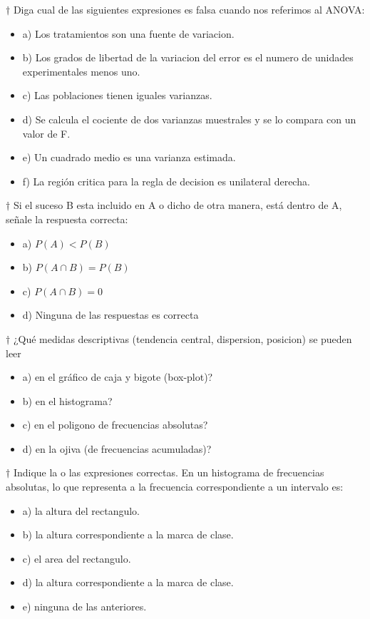 \documentclass[10pt,a4paper]{article}
\begin{document}
$\dagger$	Diga cual de las siguientes expresiones es falsa cuando nos referimos al ANOVA:
	\begin{itemize}
		\item a) Los tratamientos son una fuente de variacion.
		\item b) Los grados de libertad de la variacion del error es el numero de unidades experimentales menos uno.
		\item c) Las poblaciones tienen iguales varianzas.
		\item d) Se calcula el cociente de dos varianzas muestrales y se lo compara con un valor de F.
		\item e) Un cuadrado medio es una varianza estimada.
		\item f) La región critica para la regla de decision es unilateral derecha.
	\end{itemize}

$\dagger$ Si el suceso B esta incluido en A o dicho de otra manera, está dentro de A, señale la respuesta correcta:
\begin{itemize}
	\item a) $P(A)<P(B)$
	\item b) $P(A\cap B) = P(B)$
	\item c) $P(A\cap B) = 0$
	\item d) Ninguna de las respuestas es correcta 
\end{itemize}

$\dagger$ ¿Qué medidas descriptivas (tendencia central, dispersion, posicion) se pueden leer
\begin{itemize}
	\item a) en el gráfico de caja y bigote (box-plot)?
	\item b) en el histograma?
	\item c) en el poligono de frecuencias absolutas?
	\item d) en la ojiva (de frecuencias acumuladas)?
\end{itemize}

$\dagger$ Indique la o las expresiones correctas. En un histograma de frecuencias absolutas, lo que representa a la frecuencia correspondiente a un intervalo es:
\begin{itemize}
	\item a) la altura del rectangulo.
	\item b) la altura correspondiente a la marca de clase.
	\item c) el area del rectangulo.
	\item d) la altura correspondiente a la marca de clase.
	\item e) ninguna de las anteriores.
\end{itemize}
\end{document}
